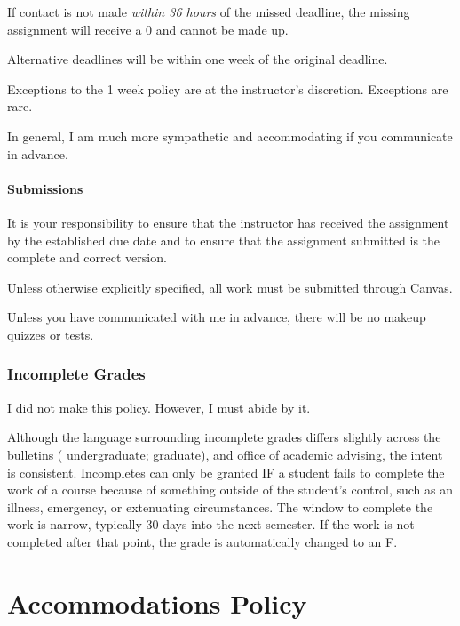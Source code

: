 If contact is not made \emph{within 36 hours} of the missed deadline, the missing assignment will receive a 0 and cannot be made up.

Alternative deadlines will be within one week of the original deadline.

Exceptions to the 1 week policy are at the instructor's discretion. Exceptions are rare.

In general, I am much more sympathetic and accommodating if you communicate in advance.

\hypertarget{submissions}{%
\subsubsection{Submissions}\label{submissions}}

It is your responsibility to ensure that the instructor has received the assignment by the established due date and to ensure that the assignment submitted is the complete and correct version.

Unless otherwise explicitly specified, all work must be submitted through Canvas.

Unless you have communicated with me in advance, there will be no makeup quizzes or tests.

\hypertarget{incomplete-grades}{%
\subsection{Incomplete Grades}\label{incomplete-grades}}

I did not make this policy. However, I must abide by it.

Although the language surrounding incomplete grades differs slightly across the bulletins ( \href{https://bulletin.wfu.edu/undergraduate/procedures/exams-grading/\#:~:text=Incomplete\%20Grade}{undergraduate}; \href{https://bulletin.wfu.edu/graduate/procedures/grading/\#:~:text=Grade\%20of\%20I}{graduate}), and office of \href{https://advising.wfu.edu/academic-challenges/incompletes/}{academic advising}, the intent is consistent.
Incompletes can only be granted IF a student fails to complete the work of a course because of something outside of the student's control, such as an illness, emergency, or extenuating circumstances. The window to complete the work is narrow, typically 30 days into the next semester. If the work is not completed after that point, the grade is automatically changed to an F.

\hypertarget{accommodations-policy}{%
\chapter{Accommodations Policy}\label{accommodations-policy}}

